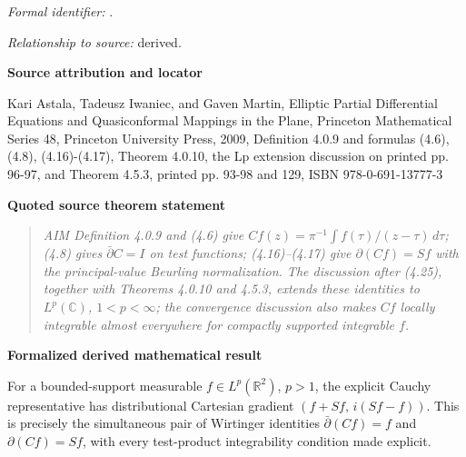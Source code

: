 \documentclass[10pt,oneside]{article}
\newenvironment{sourcequote}{\begin{quote}\itshape}{\end{quote}}
\newcommand{\reviewlabel}[1]{\par\smallskip\noindent\textsf{\bfseries #1}\par\smallskip}
\begin{document}
\subsubsection{\texttt{}}
\noindent\textit{Formal identifier:} \texttt{}.\par
\noindent\textit{Relationship to source:} derived.

\reviewlabel{Source attribution and locator}
Kari Astala, Tadeusz Iwaniec, and Gaven Martin, Elliptic Partial Differential Equations and Quasiconformal Mappings in the Plane, Princeton Mathematical Series 48, Princeton University Press, 2009, Definition 4.0.9 and formulas (4.6), (4.8), (4.16)-(4.17), Theorem 4.0.10, the Lp extension discussion on printed pp. 96-97, and Theorem 4.5.3, printed pp. 93-98 and 129, ISBN 978-0-691-13777-3

\reviewlabel{Quoted source theorem statement}
\begin{sourcequote}
AIM Definition 4.0.9 and (4.6) give $Cf(z)=\pi^{-1}\int f(\tau)/(z-\tau)\,d\tau$; (4.8) gives $\bar\partial C=I$ on test functions; (4.16)--(4.17) give $\partial(Cf)=Sf$ with the principal-value Beurling normalization. The discussion after (4.25), together with Theorems 4.0.10 and 4.5.3, extends these identities to $L^p(\mathbb C)$, $1<p<\infty$; the convergence discussion also makes $Cf$ locally integrable almost everywhere for compactly supported integrable $f$.
\end{sourcequote}

\reviewlabel{Formalized derived mathematical result}
For a bounded-support measurable $f\in L^p(\mathbb R^2)$, $p>1$, the explicit Cauchy representative has distributional Cartesian gradient $(f+Sf,\, i(Sf-f))$. This is precisely the simultaneous pair of Wirtinger identities $\bar\partial(Cf)=f$ and $\partial(Cf)=Sf$, with every test-product integrability condition made explicit.
\end{document}
